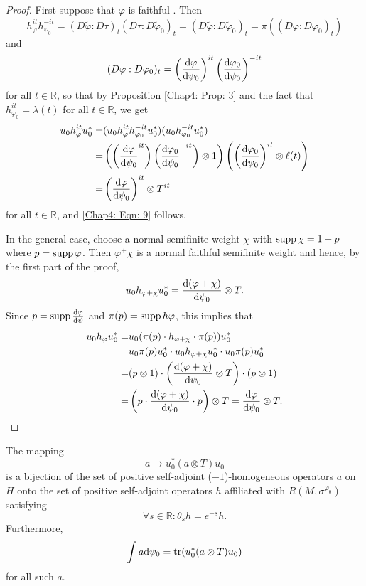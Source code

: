 \begin{proof}
    First suppose that $\varphi$ is faithful . Then
    \[
        h_\varphi^{it}h_{\varphi_0}^{-it}=(D\tilde{\varphi}:D\tau)_t(D\tau:D\tilde{\varphi}_0)_t=(D\tilde{\varphi}:D\tilde{\varphi}_0)_t=\pi((D\varphi:D\varphi_0)_t)
    \]
    and
    \[
        (D\varphi:D\varphi_0)_t=\left( \dv{\varphi}{\psi_0} \right)^{it}\left( \dv{\varphi_0}{\psi_0} \right)^{-it}
    \]
    for all $t\in \mathbb{R}$, so that by Proposition \ref{Chap4: Prop: 3} and the fact that $h_{\varphi_0}^{it}=\lambda(t)$ for all $t\in \mathbb{R}$, we get
    \[
        \begin{split}
            u_0h_\varphi^{it}u_0^*=&(u_0h_\varphi^{it}h_{\varphi_0}^{-it}u_0^*)(u_0h_{\varphi_0}^{-it}u_0^*)\\
            =&\left( \left( \dv{\varphi}{\psi_0}^{it}\right) \left( \dv{\varphi_0}{\psi_0}^{-it}  \right)\otimes 1 \right)\left( \left( \dv{\varphi_0}{\psi_0} \right)^{it}\otimes \ell(t) \right)\\
            =&\left( \dv{\varphi}{\psi_0} \right)^{it}\otimes T^{it}
        \end{split}
    \]
    for all $t\in \mathbb{R}$, and \eqref{Chap4: Eqn: 9} follows.\par
    In the general case, choose a normal semifinite weight $\chi$ with $\operatorname{supp} \chi=1-p$ where $p = \operatorname{supp} \varphi$. Then $\varphi^+ \chi$ is a normal faithful semifinite weight and hence, by the first part of the proof,
    \[
        u_0h_{\varphi+\chi}u_0^*=\dv{(\varphi+\chi)}{\psi_0}\otimes T.
    \]
    Since $p=\operatorname{supp} \dv{\varphi}{\psi}$ and $\pi(p)=\operatorname{supp} h\varphi$, this implies that
    \[
        \begin{split}
            u_0h_\varphi u_0^*=&u_0(\pi(p)\cdot h_{\varphi+\chi}\cdot \pi(p))u_0^*\\
            =&u_0\pi(p)u_0^*\cdot u_0 h_{\varphi+\chi}u_0^*\cdot u_0\pi(p)u_0^*\\
            =&(p\otimes 1)\cdot \left( \dv{(\varphi+\chi)}{\psi_0}\otimes T \right)\cdot (p\otimes 1)\\
            =&\left( p\cdot\dv{(\varphi+\chi)}{\psi_0}\cdot p \right)\otimes T=\dv{\varphi}{\psi_0}\otimes T.
        \end{split}
    \]
\end{proof}
\begin{corollary}
    The mapping
    \[
        a\mapsto u_0^*(a\otimes T)u_0
    \]
    is a bijection of the set of positive self-adjoint ($-1$)-homogeneous operators $a$ on $H$ onto the set of positive self-adjoint operators $h$ affiliated with $R(M,\sigma^{\varphi_0})$ satisfying
    \begin{equation}
        \forall s\in \mathbb{R}:\theta_s h=e^{-s}h.
    \end{equation}
    Furthermore,
    \begin{equation}
        \int a\dd \psi_0=\tr(u_0^* (a\otimes T)u_0)
    \end{equation}
    for all such $a$.
\end{corollary}
